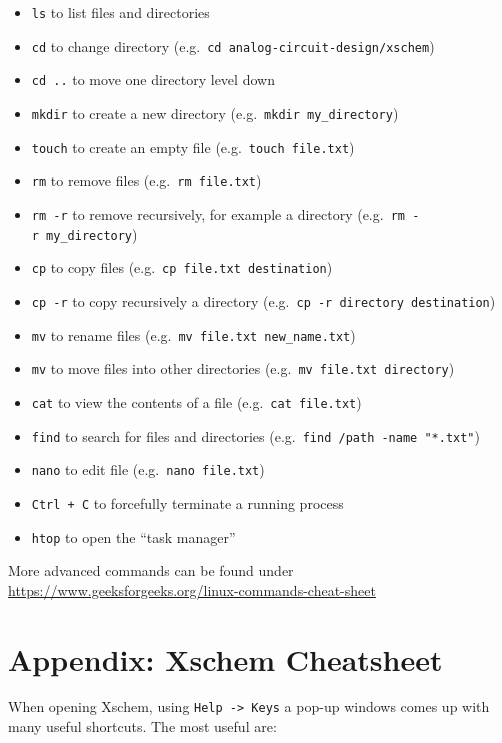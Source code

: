 \documentclass[
  a4paper,
  DIV=11,
  numbers=noendperiod]{scrartcl}
\providecommand{\tightlist}{%
  \setlength{\itemsep}{0pt}\setlength{\parskip}{0pt}}\usepackage{longtable,booktabs,array}
\begin{document}
\begin{itemize}
\tightlist
\item
  \texttt{ls} to list files and directories
\item
  \texttt{cd} to change directory
  (e.g.~\texttt{cd\ analog-circuit-design/xschem})
\item
  \texttt{cd\ ..} to move one directory level down
\item
  \texttt{mkdir} to create a new directory
  (e.g.~\texttt{mkdir\ my\_directory})
\item
  \texttt{touch} to create an empty file (e.g.~\texttt{touch\ file.txt})
\item
  \texttt{rm} to remove files (e.g.~\texttt{rm\ file.txt})
\item
  \texttt{rm\ -r} to remove recursively, for example a directory
  (e.g.~\texttt{rm\ -r\ my\_directory})
\item
  \texttt{cp} to copy files (e.g.~\texttt{cp\ file.txt\ destination})
\item
  \texttt{cp\ -r} to copy recursively a directory
  (e.g.~\texttt{cp\ -r\ directory\ destination})
\item
  \texttt{mv} to rename files
  (e.g.~\texttt{mv\ file.txt\ new\_name.txt})
\item
  \texttt{mv} to move files into other directories
  (e.g.~\texttt{mv\ file.txt\ directory})
\item
  \texttt{cat} to view the contents of a file
  (e.g.~\texttt{cat\ file.txt})
\item
  \texttt{find} to search for files and directories
  (e.g.~\texttt{find\ /path\ -name\ "*.txt"})
\item
  \texttt{nano} to edit file (e.g.~\texttt{nano\ file.txt})
\item
  \texttt{Ctrl\ +\ C} to forcefully terminate a running process
\item
  \texttt{htop} to open the ``task manager''
\end{itemize}

More advanced commands can be found under
\url{https://www.geeksforgeeks.org/linux-commands-cheat-sheet}

\section{Appendix: Xschem Cheatsheet}\label{sec-xschem-cheatsheet}

When opening Xschem, using \texttt{Help\ -\textgreater{}\ Keys} a pop-up
windows comes up with many useful shortcuts. The most useful are:
\end{document}
